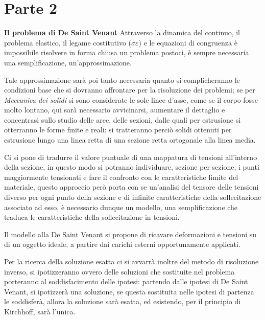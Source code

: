 \documentclass{article}
\def\outcome{\textbf{Learning Outcomes:} Outcomes go here. }
\begin{document}
	\section*{Parte 2} %

\begin{adjustwidth}{2in}{} 
	
\textbf{{\Large Il problema di De Saint
			Venant}} \mbox{} \newline
	Attraverso la dinamica del continuo, il problema elastico, il legame costitutivo ($\sigma\varepsilon$) e le equazioni di congruenza è impossibile risolvere in forma chiusa un problema postoci, è sempre necessaria una semplificazione, un'approssimazione. \newline
	
	Tale approssimazione sarà poi tanto necessaria quanto si complicheranno le condizioni base che si dovranno affrontare per la risoluzione dei problemi; se per \textit{Meccanica dei solidi} si sono considerate le sole linee d'asse, come se il corpo fosse molto lontano, qui sarà necessario avvicinarsi, aumentare il dettaglio e concentrasi sullo studio delle aree, delle sezioni, dalle quali per estrusione si otterranno le forme finite e reali: si tratteranno perciò solidi ottenuti per estrusione lungo una linea retta di una sezione retta ortogonale alla linea media. 
	
	Ci si pone di tradurre il valore puntuale di una mappatura di tensioni all'interno della sezione, in questo modo si potranno individuare, sezione per sezione, i punti maggiormente tensionati e fare il confronto con le caratteristiche limite del materiale, questo approccio però porta con se un'analisi del tensore delle tensioni diverso per ogni punto della sezione e di infinite caratteristiche della sollecitazione associato ad esso, è necessario dunque un modello, una semplificazione che traduca le caratteristiche della sollecitazione in tensioni. \newline 
	
	Il modello alla De Saint Venant si propone di ricavare deformazioni e tensioni su di un oggetto ideale, a partire dai carichi esterni opportunamente applicati. 
	
	Per la ricerca della soluzione esatta ci si avvarrà inoltre del metodo di risoluzione inverso, si ipotizzeranno ovvero delle soluzioni che sostituite nel problema porteranno al soddisfacimento delle ipotesi: partendo dalle ipotesi di De Saint Venant, si ipotizzerà una soluzione, se questa sostituita nelle ipotesi di partenza le soddisferà, allora la soluzione sarà esatta, ed esistendo, per il principio di Kirchhoff, sarà l'unica. \newline
	

\end{adjustwidth}
\end{document}
